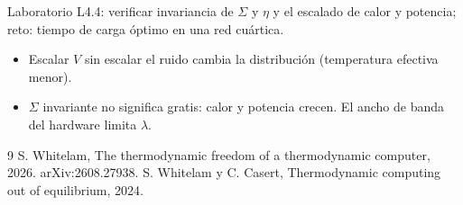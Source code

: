 \documentclass[11pt,a4paper]{article}
\begin{document}
\begin{aplicacion}
Laboratorio L4.4: verificar invariancia de $\Sigma$ y $\eta$ y el escalado de calor y potencia; reto: tiempo de carga óptimo en una red cuártica.
\end{aplicacion}

\begin{error}
\begin{itemize}[nosep]
\item Escalar $V$ sin escalar el ruido cambia la distribución (temperatura efectiva menor).
\item $\Sigma$ invariante no significa gratis: calor y potencia crecen. \quad El ancho de banda del hardware limita $\lambda$.
\end{itemize}
\end{error}

\begin{thebibliography}{9}\small
{} S. Whitelam, The thermodynamic freedom of a thermodynamic computer, 2026. arXiv:2608.27938.
 S. Whitelam y C. Casert, Thermodynamic computing out of equilibrium, 2024.
\end{thebibliography}
\end{document}
